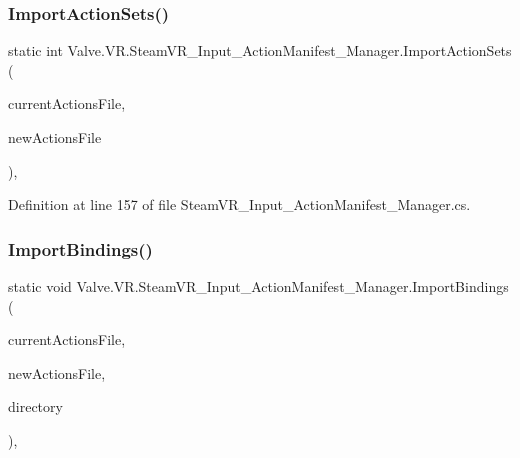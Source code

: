 \mbox{\label{class_valve_1_1_v_r_1_1_steam_v_r___input___action_manifest___manager_ae05cd013681c8f20325b146f570d42db}} 
\subsubsection{\texorpdfstring{ImportActionSets()}{ImportActionSets()}}
{\footnotesize\ttfamily static int Valve.\+V\+R.\+Steam\+V\+R\+\_\+\+Input\+\_\+\+Action\+Manifest\+\_\+\+Manager.\+Import\+Action\+Sets (\begin{DoxyParamCaption}\item[{\mbox{\hyperlink{class_valve_1_1_v_r_1_1_steam_v_r___input___action_file}{Steam\+V\+R\+\_\+\+Input\+\_\+\+Action\+File}}}]{current\+Actions\+File,  }\item[{\mbox{\hyperlink{class_valve_1_1_v_r_1_1_steam_v_r___input___action_file}{Steam\+V\+R\+\_\+\+Input\+\_\+\+Action\+File}}}]{new\+Actions\+File }\end{DoxyParamCaption})\hspace{0.3cm}{\ttfamily [static]}, {\ttfamily [protected]}}



Definition at line 157 of file Steam\+V\+R\+\_\+\+Input\+\_\+\+Action\+Manifest\+\_\+\+Manager.\+cs.

\mbox{\label{class_valve_1_1_v_r_1_1_steam_v_r___input___action_manifest___manager_a8391a5a51019c10a04745119ae1e16d5}} 
\subsubsection{\texorpdfstring{ImportBindings()}{ImportBindings()}}
{\footnotesize\ttfamily static void Valve.\+V\+R.\+Steam\+V\+R\+\_\+\+Input\+\_\+\+Action\+Manifest\+\_\+\+Manager.\+Import\+Bindings (\begin{DoxyParamCaption}\item[{\mbox{\hyperlink{class_valve_1_1_v_r_1_1_steam_v_r___input___action_file}{Steam\+V\+R\+\_\+\+Input\+\_\+\+Action\+File}}}]{current\+Actions\+File,  }\item[{\mbox{\hyperlink{class_valve_1_1_v_r_1_1_steam_v_r___input___action_file}{Steam\+V\+R\+\_\+\+Input\+\_\+\+Action\+File}}}]{new\+Actions\+File,  }\item[{string}]{directory }\end{DoxyParamCaption})\hspace{0.3cm}{\ttfamily [static]}, {\ttfamily [protected]}}



